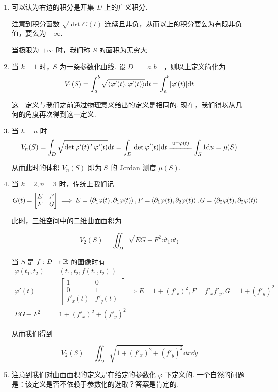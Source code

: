 \begin{hint}
    \begin{enumerate}
        \item 可以认为右边的积分是开集 $D$ 上的广义积分.
        
        注意到积分函数 $\sqrt{\det G(t)}$ 连续且非负，从而以上的积分要么为有限非负值，要么为 $+\infty$.

        当极限为 $+\infty$ 时，我们称 $S$ 的面积为无穷大.

        \item 当 $k=1$ 时，$S$ 为一条参数化曲线. 设 $D=[a,b]$ ，则以上定义简化为
$$
V_1(S)=\int_a^b\sqrt{\left\langle{\varphi'(t),\varphi'(t)}\right\rangle}\mathrm{d} t=\int_a^b\lvert{\varphi'(t)}\rvert\mathrm{d} t
$$
        
        这一定义与我们之前通过物理意义给出的定义是相同的. 现在，我们得以从几何的角度再次得到这一定义.

        \item 当 $k=n$ 时
$$
V_n(S)=\int_D\sqrt{\det \varphi'(t)^T\varphi'(t)}\dd t=\int_D\abs{\det\varphi'(t)}\dd t\xlongequal{u=\varphi(t)}\int_S1\dd u=\mu(S)
$$

        从而此时的体积 $V_n(S)$ 即为 $S$ 的 Jordan 测度 $\mu(S)$.

        \item 当 $k=2,n=3$ 时，传统上我们记
$$
G(t)=\begin{bmatrix}
    E & F\\
    F & G
\end{bmatrix}\implies
E=\left\langle{\partial_1\varphi(t),\partial_1\varphi(t)}\right\rangle,
F=\left\langle{\partial_1\varphi(t),\partial_2\varphi(t)}\right\rangle,
G=\left\langle{\partial_2\varphi(t),\partial_2\varphi(t)}\right\rangle
$$

        此时，三维空间中的二维曲面面积为
        \begin{property}
$$
V_2(S)=\iint_D\sqrt{EG-F^2}\dd t_1\dd t_2
$$
        \end{property}

        当 $S$ 是 $f:D\to\mathbb{R}$ 的图像时有
$$
\begin{aligned}
    \varphi(t_1,t_2)&=(t_1,t_2,f(t_1,t_2))\\
    \varphi'(t)&=\begin{bmatrix}
        1 & 0\\
        0 & 1\\
        f'_x(t) & f'_y(t)
    \end{bmatrix}\implies
    E=1+(f'_x)^2,
    F=f'_xf'_y,
    G=1+(f'_y)^2\\
    EG-F^2&=1+(f'_x)^2+(f'_y)^2
\end{aligned}
$$

        从而我们得到
        \begin{property}
$$
V_2(S)=\iint_D\sqrt{1+(f'_x)^2+(f'_y)^2}\dd x\dd y
$$
        \end{property}

        \item 注意到我们对曲面面积的定义是在给定的参数化 $\varphi$ 下定义的. 一个自然的问题是：该定义是否不依赖于参数化的选取？答案是肯定的.
    \end{enumerate}
\end{hint}

